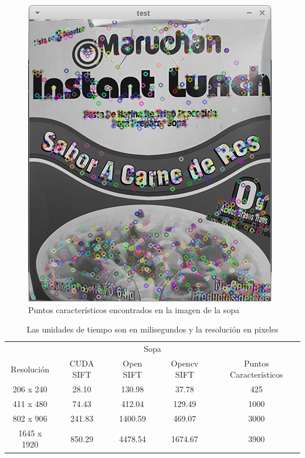 \begin{figure}[ph]
			\centering
				\includegraphics[scale=1]{img/sopa.png}
			\caption{Puntos característicos encontrados en la imagen de la sopa}
\end{figure}

\begin{table}[phtb]
\centering
\begin{tabular}{|c|c|c|c|c|}
\hline

\multicolumn{5}{|c|}{Sopa} \\
\cline{1-5}
Resolución & CUDA SIFT & Open SIFT & Opencv SIFT & Puntos Característicos\\
\hline \hline
 206 x 240  & 28.10  &  130.98  & 37.78   & 425\\ \cline{1-5}
 411 x 480  & 74.43  &  412.04  & 129.49  & 1000\\ \cline{1-5}
 802 x 906  & 241.83 &  1400.59 & 469.07  & 3000\\ \cline{1-5}
1645 x 1920 & 850.29 &  4478.54 & 1674.67 & 3900\\ \cline{1-5}

\end{tabular}
\caption{Las unidades de tiempo son en milisegundos y la resolución en pixeles}
\label{tabla:final}
\end{table}




